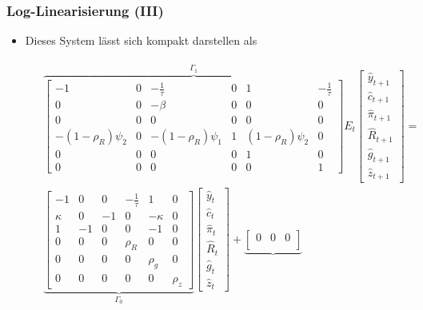 \documentclass[10pt]{beamer}  %
\begin{document}
\begin{frame}\frametitle{Log-Linearisierung (III)}\small
\begin{itemize}
\item Dieses System l\"{a}sst sich kompakt darstellen als
\begin{scriptsize}\begin{align*}
\begin{split}
&  \overbrace{\begin{bmatrix}
  -1 &0                 & -\frac{1}{\tau}                  & 0 &  1 &     -\frac{1}{\tau}          \\
  0            &0 &-\beta          &   0 & 0  &     0          \\
    0&0&0&0&0&0\\
  -(1-\rho_R)\psi_2 &0 & -(1-\rho_R)\psi_1 &  1 & (1-\rho_R)\psi_2 &0\\
  0&0&0&0&1&0\\
  0 & 0& 0&0&0&1
  \end{bmatrix}}^{\Gamma_1}
  E_t\begin{bmatrix}
  \widehat{y}_{t+1}\\ \widehat{c}_{t+1}\\\widehat{\pi}_{t+1}\\\widehat{R}_{t+1}\\\widehat{g}_{t+1}\\ \widehat{z}_{t+1}
  \end{bmatrix} =\\
&  \underbrace{\begin{bmatrix}
  -1   &0& 0 &  -\frac{1}{\tau} & 1  &     0          \\
   \kappa &0 & -1 & 0 & -\kappa  &  0     \\
  1   &-1 & 0 &  0 & -1 & 0   \\
  0 &0 & 0 &  \rho_R &  0 &0 \\
  0&0 & 0& 0&\rho_g&0\\
  0&0&0&0&0&\rho_z
  \end{bmatrix}}_{\Gamma_0}
  \begin{bmatrix}
  \widehat{y}_{t}\\ \widehat{c}_{t}\\ \widehat{\pi}_{t}\\ \widehat{R}_{t} \\ \widehat{g}_{t}\\ \widehat{z}_{t}
  \end{bmatrix} +
  \underbrace{\begin{bmatrix}
    0&0&0\\

\end{bmatrix}}
\end{split}
\end{align*}
\end{scriptsize}
\end{itemize}
\end{frame}
\end{document}
